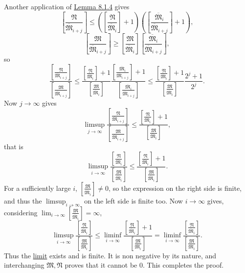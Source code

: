 \documentclass[12pt,b5paper,twoside]{article}
\newcommand{\reldiv}[2]{\left[\frac{#1}{#2}\right]}
\newcommand{\lemref}[1]{\hyperref[lem:#1]{Lemma #1}}
\begin{document}
Another application of \lemref{8.1.4} gives
\[
 \reldiv{\mathfrak N}{\overline{\mathfrak M}_{i+j}}
 \leq
 \left(\reldiv{\mathfrak N}{\overline{\mathfrak M}_i}+1\right)
 \left(\reldiv{\overline{\mathfrak M}_i}{\overline{\mathfrak M}_{i+j}}+1\right),
\]
\[
 \reldiv{\mathfrak M}{\overline{\mathfrak M}_{i+j}}
 \geq
 \reldiv{\mathfrak M}{\overline{\mathfrak M}_i}
 \reldiv{\overline{\mathfrak M}_i}{\overline{\mathfrak M}_{i+j}},
\]
so
\[
 \frac{\reldiv{\mathfrak N}{\overline{\mathfrak M}_{i+j}}}
      {\reldiv{\mathfrak M}{\overline{\mathfrak M}_{i+j}}}
 \leq
 \frac{\reldiv{\mathfrak N}{\overline{\mathfrak M}_i}+1}
      {\reldiv{\mathfrak M}{\overline{\mathfrak M}_i}}
 \frac{\reldiv{\overline{\mathfrak M}_i}{\overline{\mathfrak M}_{i+j}}+1}
      {\reldiv{\overline{\mathfrak M}_i}{\overline{\mathfrak M}_{i+j}}}
 \leq
 \frac{\reldiv{\mathfrak N}{\overline{\mathfrak M}_i}+1}
      {\reldiv{\mathfrak M}{\overline{\mathfrak M}_i}}
 \frac{2^j+1}{2^j}.
\]
Now $j\to\infty$ gives
\[
 \limsup_{j\to\infty}
 \frac{\reldiv{\mathfrak N}{\overline{\mathfrak M}_{i+j}}}
      {\reldiv{\mathfrak M}{\overline{\mathfrak M}_{i+j}}}
 \leq
 \frac{\reldiv{\mathfrak N}{\overline{\mathfrak M}_i}+1}
      {\reldiv{\mathfrak M}{\overline{\mathfrak M}_i}},
\]
that is
\[
 \limsup_{i\to\infty}
 \frac{\reldiv{\mathfrak N}{\overline{\mathfrak M}_i}}
      {\reldiv{\mathfrak M}{\overline{\mathfrak M}_i}}
 \leq
 \frac{\reldiv{\mathfrak N}{\overline{\mathfrak M}_i}+1}
      {\reldiv{\mathfrak M}{\overline{\mathfrak M}_i}}.
\]
For a sufficiently large $i$,
$\reldiv{\mathfrak M}{\overline{\mathfrak M}_i}\ne0$, so the expression on
the right side is finite, and thus the $\limsup_{i\to\infty}$ on the left side is
finite too. Now $i\to\infty$ gives, considering
$\lim_{i\to\infty}\reldiv{\mathfrak M}{\overline{\mathfrak M}_i}=\infty$,
\[
 \limsup_{i\to\infty}
 \frac{\reldiv{\mathfrak N}{\overline{\mathfrak M}_i}}
      {\reldiv{\mathfrak M}{\overline{\mathfrak M}_i}}
 \leq
 \liminf_{i\to\infty}
 \frac{\reldiv{\mathfrak N}{\overline{\mathfrak M}_i}+1}
      {\reldiv{\mathfrak M}{\overline{\mathfrak M}_i}}
 =
 \liminf_{i\to\infty}
 \frac{\reldiv{\mathfrak N}{\overline{\mathfrak M}_i}}
      {\reldiv{\mathfrak M}{\overline{\mathfrak M}_i}}.
\]
Thus the \hyperref[eq:8.1.1]{limit} exists and is finite. It is non negative by
its nature, and interchanging $\mathfrak M,\mathfrak N$ proves that it cannot
be $0$. This completes the proof.
\end{document}
